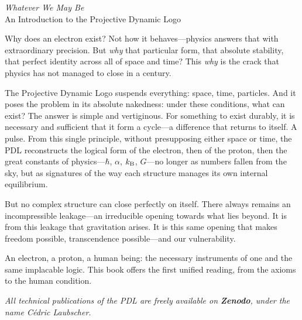 \documentclass[12pt,a4paper]{article}
\begin{document}
\begin{center}
{\large\itshape Whatever We May Be}\\[0.3em]
{\small An Introduction to the Projective Dynamic Logo}
\end{center}

\bigskip

Why does an electron exist? Not how it behaves---physics answers that with extraordinary precision. But \emph{why} that particular form, that absolute stability, that perfect identity across all of space and time? This \emph{why} is the crack that physics has not managed to close in a century.

The Projective Dynamic Logo suspends everything: space, time, particles. And it poses the problem in its absolute nakedness: under these conditions, what can exist? The answer is simple and vertiginous. For something to exist durably, it is necessary and sufficient that it form a cycle---a difference that returns to itself. A pulse. From this single principle, without presupposing either space or time, the PDL reconstructs the logical form of the electron, then of the proton, then the great constants of physics---$\hbar$, $\alpha$, $k_{\rm B}$, $G$---no longer as numbers fallen from the sky, but as signatures of the way each structure manages its own internal equilibrium.

But no complex structure can close perfectly on itself. There always remains an incompressible leakage---an irreducible opening towards what lies beyond. It is from this leakage that gravitation arises. It is this same opening that makes freedom possible, transcendence possible---and our vulnerability.

An electron, a proton, a human being: the necessary instruments of one and the same implacable logic. This book offers the first unified reading, from the axioms to the human condition.

\bigskip

\begin{center}
{\small\itshape All technical publications of the PDL are freely available on \textbf{Zenodo}, under the name Cédric Laubscher.}
\end{center}
\end{document}
